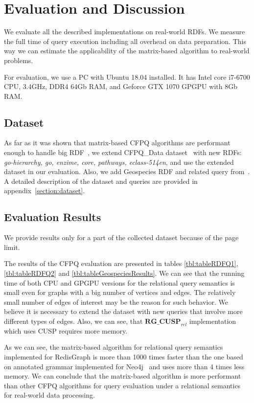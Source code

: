\section{Evaluation and Discussion}

We evaluate all the described implementations on real-world RDFs.
We measure the full time of query execution including all overhead on data preparation.
This way we can estimate the applicability of the matrix-based algorithm to real-world problems.

For evaluation, we use a PC with Ubuntu 18.04 installed.
It has Intel core i7-6700 CPU, 3.4GHz, DDR4 64Gb RAM, and Geforce GTX 1070 GPGPU with 8Gb RAM.

\subsection{Dataset}
As far as it was shown that matrix-based CFPQ algorithms are performant enough to handle big RDF~\cite{Mishin:2019:ECP:3327964.3328503}, we extend CFPQ\_Data dataset~\cite{Mishin:2019:ECP:3327964.3328503} with new RDFs: \textit{go-hierarchy, go, enzime, core, pathways, eclass-514en}, and use the extended dataset in our evaluation. Also, we add Geospecies RDF and related query from~\cite{Kuijpers:2019:ESC:3335783.3335791}. 
A detailed description of the dataset and queries are provided in appendix~\ref{section:dataset}.


\subsection{Evaluation Results}
We provide results only for a part of the collected dataset because of the page limit.

The results of the CFPQ evaluation are presented in tables \ref{tbl:tableRDFQ1}, \ref{tbl:tableRDFQ2} and \ref{tbl:tableGeospeciesResults}.
We can see that the running time of both CPU and GPGPU versions for the relational query semantics is small even for graphs with a big number of vertices and edges.
The relatively small number of edges of interest may be the reason for such behavior.
We believe it is necessary to extend the dataset with new queries that involve more different types of edges.
Also, we can see, that $\textbf{RG\_CUSP}_{\textit{rel}}$ implementation which uses CUSP requires more memory.

As we can see, the matrix-based algorithm for relational query semantics implemented for RedisGraph is more than 1000 times faster than the one based on annotated grammar implemented for Neo4j~\cite{Kuijpers:2019:ESC:3335783.3335791} and uses more than 4 times less memory.
We can conclude that the matrix-based algorithm is more performant than other CFPQ algorithms for query evaluation under a relational semantics for real-world data processing.

